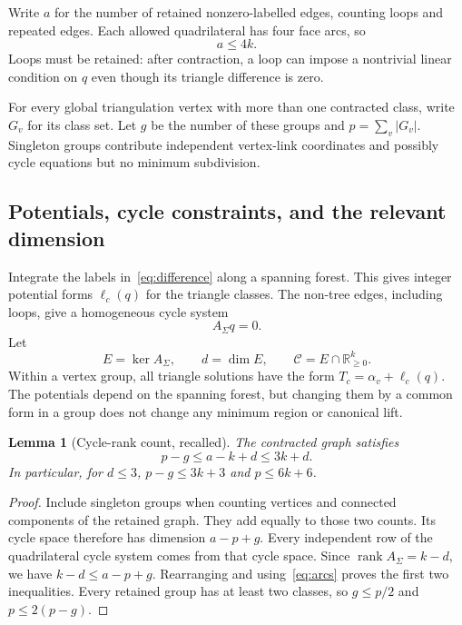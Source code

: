\documentclass[11pt,letterpaper]{article}
\newtheorem{lemma}[theorem]{Lemma}
\theoremstyle{definition}
\theoremstyle{remark}\newtheorem{remark}[theorem]{Remark}
\newcommand{\R}{\mathbb R}\newcommand{\Q}{\mathbb Q}
\newcommand{\cone}{\mathcal C}\newcommand{\stdcone}{\mathcal S}
\newcommand{\rank}{\operatorname{rank}}
\begin{document}
Write $a$ for the number of retained nonzero-labelled edges, counting loops
and repeated edges. Each allowed quadrilateral has four face arcs, so
\begin{equation}
 a\le4k.
 \label{eq:arcs}
\end{equation}
Loops must be retained: after contraction, a loop can impose a nontrivial
linear condition on $q$ even though its triangle difference is zero.

For every global triangulation vertex with more than one contracted class,
write $G_v$ for its class set. Let $g$ be the number of these groups and
$p=\sum_v|G_v|$. Singleton groups contribute independent vertex-link
coordinates and possibly cycle equations but no minimum subdivision.

\subsection{Potentials, cycle constraints, and the relevant dimension}

Integrate the labels in~\eqref{eq:difference} along a spanning forest.
This gives integer potential forms $\ell_c(q)$ for the triangle classes.
The non-tree edges, including loops, give a homogeneous cycle system
\[
 A_\Sigma q=0.
\]
Let
\begin{equation}
 E=\ker A_\Sigma,\qquad d=\dim E,\qquad
 \cone=E\cap\R^k_{\ge0}.
 \label{eq:cone}
\end{equation}
Within a vertex group, all triangle solutions have the form
$T_c=\alpha_v+\ell_c(q)$. The potentials depend on the spanning forest,
but changing them by a common form in a group does not change any minimum
region or canonical lift.

\begin{lemma}[Cycle-rank count, recalled]
\label{lem:graphcount}
The contracted graph satisfies
\[
 p-g\le a-k+d\le3k+d.
\]
In particular, for $d\le3$, $p-g\le3k+3$ and $p\le6k+6$.
\end{lemma}

\begin{proof}
Include singleton groups when counting vertices and connected components
of the retained graph. They add equally to those two counts. Its cycle
space therefore has dimension $a-p+g$. Every independent row of the
quadrilateral cycle system comes from that cycle space. Since
$\rank A_\Sigma=k-d$, we have $k-d\le a-p+g$. Rearranging and
using~\eqref{eq:arcs} proves the first two inequalities. Every retained
group has at least two classes, so $g\le p/2$ and $p\le2(p-g)$.
\end{proof}
\end{document}
